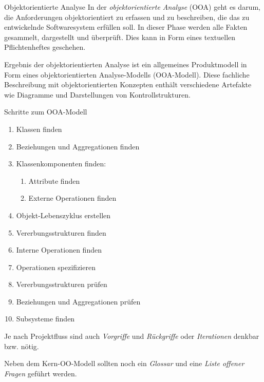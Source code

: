 \begin{defi}{Objektorientierte Analyse}
    In der \emph{objektorientierte Analyse} (OOA) geht es darum, die Anforderungen objektorientiert zu erfassen und zu beschreiben, die das zu entwickelnde Softwaresystem erfüllen soll.
    In dieser Phase werden alle Fakten gesammelt, dargestellt und überprüft.
    Dies kann in Form eines textuellen Pflichtenheftes geschehen.

    Ergebnis der objektorientierten Analyse ist ein allgemeines Produktmodell in Form eines objektorientierten Analyse-Modells (OOA-Modell).
    Diese fachliche Beschreibung mit objektorientierten Konzepten enthält verschiedene Artefakte wie Diagramme und Darstellungen von Kontrollstrukturen.
\end{defi}

\begin{defi}{Schritte zum OOA-Modell}
    \begin{enumerate}
        \item Klassen finden
        \item Beziehungen und Aggregationen finden
        \item Klassenkomponenten finden:
              \begin{enumerate}
                  \item Attribute finden
                  \item Externe Operationen finden
              \end{enumerate}
        \item Objekt-Lebenszyklus erstellen
        \item Vererbungsstrukturen finden
        \item Interne Operationen finden
        \item Operationen spezifizieren
        \item Vererbungsstrukturen prüfen
        \item Beziehungen und Aggregationen prüfen
        \item Subsysteme finden
    \end{enumerate}

    Je nach Projektfluss sind auch \emph{Vorgriffe} und \emph{Rückgriffe} oder \emph{Iterationen} denkbar bzw. nötig.

    Neben dem Kern-OO-Modell sollten noch ein \emph{Glossar} und eine \emph{Liste offener Fragen} geführt werden.
\end{defi}

